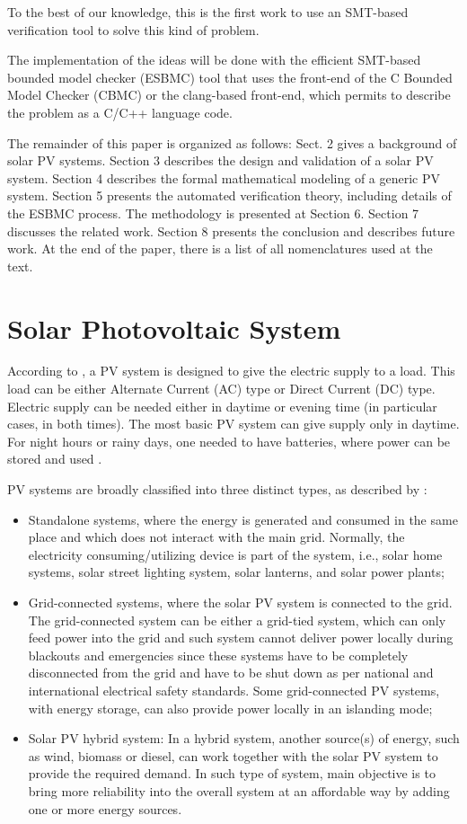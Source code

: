 \documentclass[journal]{IEEEtran}
\begin{document}
To the best of our knowledge, this is the first work to use an SMT-based verification tool to solve this kind of problem. 

The implementation of the ideas will be done with the efficient SMT-based bounded model checker (ESBMC) tool that uses the front-end of the C Bounded Model Checker (CBMC) or the clang-based front-end, which permits to describe the problem as a C/C++ language code.
 
The remainder of this paper is organized as follows: Sect. 2 gives a background of solar PV systems. Section 3 describes the design and validation of a solar PV system. Section 4 describes the formal mathematical modeling of a generic PV system. Section 5 presents the automated verification theory, including details of the ESBMC process. The methodology is presented at Section 6. Section 7 discusses the related work. Section 8 presents the conclusion and describes future work. At the end of the paper, there is a list of all nomenclatures used at the text. 

\section{Solar Photovoltaic System }
According to \cite{Roy}, a PV system is designed to give the electric supply to a load. This load can be either Alternate Current (AC) type or Direct Current (DC) type. Electric supply can be needed either in daytime or evening time (in particular cases, in both times). The most basic PV system can give supply only in daytime.  For night hours or rainy days, one needed to have batteries, where power can be stored and used \cite{Gules}. 

PV systems are broadly classified into three distinct types, as described by \cite{Mohanty}: 

\begin{itemize}
\item Standalone systems, where the energy is generated and consumed in the same place and which does not interact with the main grid. Normally, the electricity consuming/utilizing device is part of the system, i.e., solar home systems, solar street lighting system, solar lanterns, and solar power plants; 
\item Grid-connected systems, where the solar PV system is connected to the grid. The grid-connected system can be either a grid-tied system, which can only feed power into the grid and such system cannot deliver power locally during blackouts and emergencies since these systems have to be completely disconnected from the grid and have to be shut down as per national and international electrical safety standards. Some grid-connected PV systems, with energy storage, can also provide power locally in an islanding mode; 
\item Solar PV hybrid system: In a hybrid system, another source(s) of energy, such as wind, biomass or diesel, can work together with the solar PV system to provide the required demand. In such type of system, main objective is to bring more reliability into the overall system at an affordable way by adding one or more energy sources.
\end{itemize}
 
\end{document}
